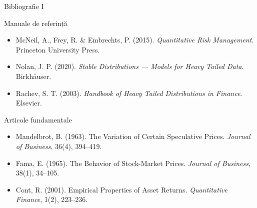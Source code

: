 \documentclass[9pt, aspectratio=169, t]{beamer}
\theoremstyle{definition}
\newenvironment{cminipage}[1]{%
    \par\noindent\hfill\begin{minipage}{#1}\ignorespaces
}{%
    \end{minipage}\hfill\null\par
}
\begin{document}
\begin{frame}{Bibliografie I}
    \begin{cminipage}{0.95\textwidth}
    \begin{block}{Manuale de referință}
        {\small
        \begin{itemize}\setlength{\itemsep}{0pt}
            \item McNeil, A., Frey, R. \& Embrechts, P. (2015). \textit{Quantitative Risk Management}. Princeton University Press.
            \item Nolan, J. P. (2020). \textit{Stable Distributions --- Models for Heavy Tailed Data}. Birkh\"{a}user.
            \item Rachev, S. T. (2003). \textit{Handbook of Heavy Tailed Distributions in Finance}. Elsevier.
        \end{itemize}
        }
    \end{block}

    \begin{exampleblock}{Articole fundamentale}
        {\small
        \begin{itemize}\setlength{\itemsep}{0pt}
            \item Mandelbrot, B. (1963). The Variation of Certain Speculative Prices. \textit{Journal of Business}, 36(4), 394--419.
            \item Fama, E. (1965). The Behavior of Stock-Market Prices. \textit{Journal of Business}, 38(1), 34--105.
            \item Cont, R. (2001). Empirical Properties of Asset Returns. \textit{Quantitative Finance}, 1(2), 223--236.
        \end{itemize}
        }
    \end{exampleblock}
    \end{cminipage}
\end{frame}
\end{document}
